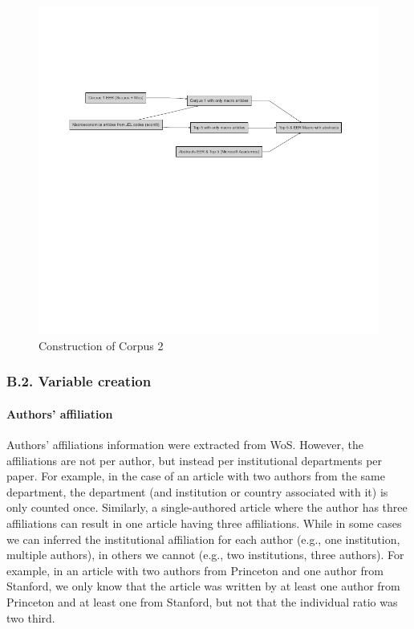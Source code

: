 \documentclass[]{elsarticle} %
\begin{document}
\begin{figure}[!ht]

{\centering \includegraphics[width=1\linewidth]{First_version_files/figure-latex/plot-diagram-corpus-1} 

}

\caption{Construction of Corpus 2}\label{fig:plot-diagram-corpus}
\end{figure}

\hypertarget{b.2.-variable-creation}{%
\subsubsection*{B.2. Variable creation}\label{b.2.-variable-creation}}

\hypertarget{author-affiliation}{%
\paragraph*{Authors' affiliation}\label{author-affiliation}}

Authors' affiliations information were extracted from WoS. However, the
affiliations are not per author, but instead per institutional
departments per paper. For example, in the case of an article with two
authors from the same department, the department (and institution or
country associated with it) is only counted once. Similarly, a
single-authored article where the author has three affiliations can
result in one article having three affiliations. While in some cases we
can inferred the institutional affiliation for each author (e.g., one
institution, multiple authors), in others we cannot (e.g., two
institutions, three authors). For example, in an article with two
authors from Princeton and one author from Stanford, we only know that
the article was written by at least one author from Princeton and at
least one from Stanford, but not that the individual ratio was two
third.
\end{document}

